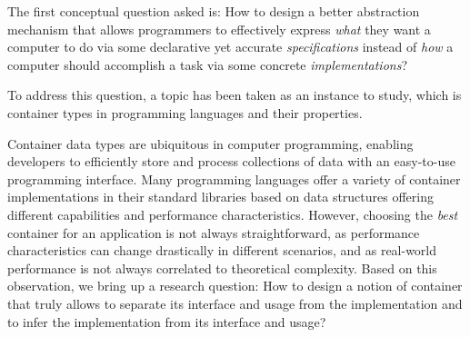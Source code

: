 
\begin{center}
\vspace{-0.7em}
\vspace{-0.3em}
\end{center}

The first conceptual question asked is: 
How to design a better abstraction mechanism that allows programmers to effectively express \emph{what} they want a computer to do via some declarative yet accurate \emph{specifications} instead of \emph{how} a computer should accomplish a task via some concrete \emph{implementations}?


To address this question, a topic has been taken as an instance to study, which is container types in programming languages and their properties. 

Container data types are ubiquitous in computer programming, enabling developers to efficiently store and process collections of data with an easy-to-use programming interface.
Many programming languages offer a variety of container implementations in their standard libraries based on data structures offering different capabilities and performance characteristics.
However, choosing the \emph{best} container for an application is not always straightforward, as performance characteristics can change drastically in different scenarios, and as real-world performance is not always correlated to theoretical complexity. Based on this observation, we bring up a research question: How to design a notion of container that truly allows to separate its interface and usage from the implementation and to infer the implementation from its interface and usage?

